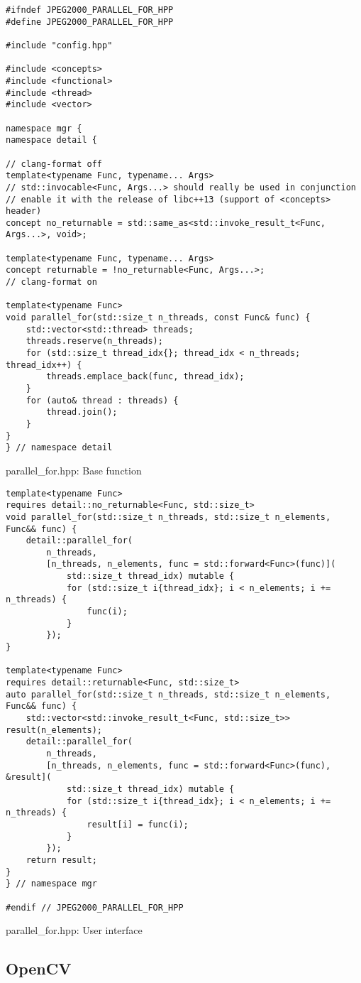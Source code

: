 \begin{listing}[htb]
\begin{verbatim}
#ifndef JPEG2000_PARALLEL_FOR_HPP
#define JPEG2000_PARALLEL_FOR_HPP

#include "config.hpp"

#include <concepts>
#include <functional>
#include <thread>
#include <vector>

namespace mgr {
namespace detail {

// clang-format off
template<typename Func, typename... Args>
// std::invocable<Func, Args...> should really be used in conjunction
// enable it with the release of libc++13 (support of <concepts> header)
concept no_returnable = std::same_as<std::invoke_result_t<Func, Args...>, void>;

template<typename Func, typename... Args>
concept returnable = !no_returnable<Func, Args...>;
// clang-format on

template<typename Func>
void parallel_for(std::size_t n_threads, const Func& func) {
    std::vector<std::thread> threads;
    threads.reserve(n_threads);
    for (std::size_t thread_idx{}; thread_idx < n_threads; thread_idx++) {
        threads.emplace_back(func, thread_idx);
    }
    for (auto& thread : threads) {
        thread.join();
    }
}
} // namespace detail
\end{verbatim}
\caption{parallel\_for.hpp: Base function}
\label{lst:parallel_for_base_function}
\end{listing}

\begin{listing}[htb]
\begin{verbatim}
template<typename Func>
requires detail::no_returnable<Func, std::size_t>
void parallel_for(std::size_t n_threads, std::size_t n_elements, Func&& func) {
    detail::parallel_for(
        n_threads,
        [n_threads, n_elements, func = std::forward<Func>(func)](
            std::size_t thread_idx) mutable {
            for (std::size_t i{thread_idx}; i < n_elements; i += n_threads) {
                func(i);
            }
        });
}

template<typename Func>
requires detail::returnable<Func, std::size_t>
auto parallel_for(std::size_t n_threads, std::size_t n_elements, Func&& func) {
    std::vector<std::invoke_result_t<Func, std::size_t>> result(n_elements);
    detail::parallel_for(
        n_threads,
        [n_threads, n_elements, func = std::forward<Func>(func), &result](
            std::size_t thread_idx) mutable {
            for (std::size_t i{thread_idx}; i < n_elements; i += n_threads) {
                result[i] = func(i);
            }
        });
    return result;
}
} // namespace mgr

#endif // JPEG2000_PARALLEL_FOR_HPP
\end{verbatim}
\caption{parallel\_for.hpp: User interface}
\label{lst:parallel_for_user_interface}
\end{listing}

\subsection{OpenCV}
